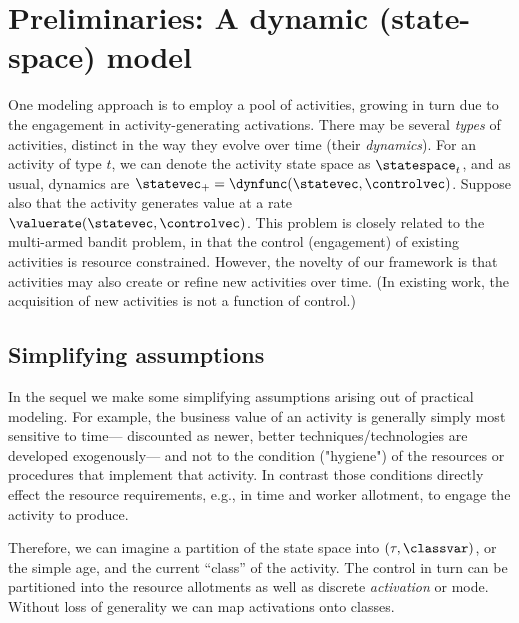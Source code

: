 \documentclass[10pt,a4paper]{article}
\begin{document}
\section{Preliminaries: A dynamic (state-space) model}

\makecommand{\statevec}{{\rm \statevar}}
\makecommand{\controlvec}{{\rm \controlvar}}


One modeling approach is to employ a pool of activities,
growing in turn due to the engagement in activity-generating activations.
%
There may be several \emph{types} of activities, distinct in the way they evolve over time (their \emph{dynamics}).
For an activity of type $t$, we can denote the activity state space as $\statespace_t$, and as usual, dynamics are
$\statevec_+ = \dynfunc(\statevec, \controlvec)$.
Suppose also that the activity generates value at a rate
$\valuerate(\statevec, \controlvec)$.
%
This problem is closely related to the multi-armed bandit problem, in that
the control (engagement) of existing activities is resource constrained.
%
However, the novelty of our framework is that activities may also create or refine new activities over time.
%
(In existing work, the acquisition of new activities is not a function of control.)

\subsection{Simplifying assumptions}

In the sequel we make some simplifying assumptions arising out of practical modeling.
For example, the business value of an activity is generally simply most sensitive to time---%
discounted as newer, better techniques/technologies are developed exogenously---%
and not to the condition ("hygiene") of the resources or procedures that implement that activity.
In contrast those conditions directly effect the resource requirements, e.g., in time and worker allotment, to engage the activity to produce.

Therefore, we can imagine a partition of the state space into $(\tau, \classvar)$, or
the simple age, and the current ``class'' of the activity.
The control in turn can be partitioned into the resource allotments as well as discrete \emph{activation} or mode.  Without loss of generality we can map activations onto classes.  
\end{document}
